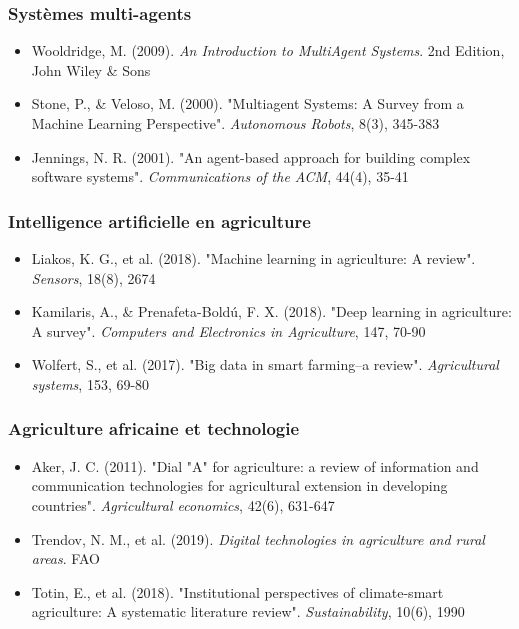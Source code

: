 \subsubsection{Systèmes multi-agents}
\begin{itemize}
    \item Wooldridge, M. (2009). \textit{An Introduction to MultiAgent Systems}. 2nd Edition, John Wiley \& Sons
    \item Stone, P., \& Veloso, M. (2000). "Multiagent Systems: A Survey from a Machine Learning Perspective". \textit{Autonomous Robots}, 8(3), 345-383
    \item Jennings, N. R. (2001). "An agent-based approach for building complex software systems". \textit{Communications of the ACM}, 44(4), 35-41
\end{itemize}

\subsubsection{Intelligence artificielle en agriculture}
\begin{itemize}
    \item Liakos, K. G., et al. (2018). "Machine learning in agriculture: A review". \textit{Sensors}, 18(8), 2674
    \item Kamilaris, A., \& Prenafeta-Boldú, F. X. (2018). "Deep learning in agriculture: A survey". \textit{Computers and Electronics in Agriculture}, 147, 70-90
    \item Wolfert, S., et al. (2017). "Big data in smart farming–a review". \textit{Agricultural systems}, 153, 69-80
\end{itemize}

\subsubsection{Agriculture africaine et technologie}
\begin{itemize}
    \item Aker, J. C. (2011). "Dial "A" for agriculture: a review of information and communication technologies for agricultural extension in developing countries". \textit{Agricultural economics}, 42(6), 631-647
    \item Trendov, N. M., et al. (2019). \textit{Digital technologies in agriculture and rural areas}. FAO
    \item Totin, E., et al. (2018). "Institutional perspectives of climate-smart agriculture: A systematic literature review". \textit{Sustainability}, 10(6), 1990
\end{itemize}

